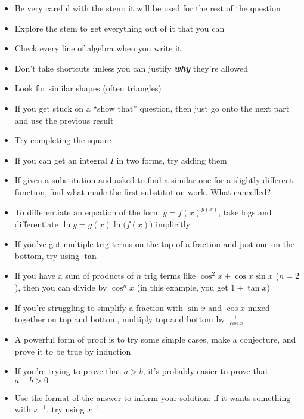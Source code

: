 \documentclass[../main.tex]{subfile}
\begin{document}


\begin{itemize}
	\item Be very careful with the stem; it will be used for the rest of the question
	\item Explore the stem to get everything out of it that you can
	\item Check every line of algebra when you write it
	\item Don't take shortcuts unless you can justify {\Large\textit{\textbf{why}}} they're allowed
	\item Look for similar shapes (often triangles)
	\item If you get stuck on a \enquote{show that} question, then just go onto the next part and use the previous result
	\item Try completing the square
\end{itemize}


\begin{itemize}
	\item If you can get an integral $I$ in two forms, try adding them
	\item If given a substitution and asked to find a similar one for a slightly different function, find what made the first substitution work. What cancelled?
	\item To differentiate an equation of the form $y = f(x)^{g(x)}$, take logs and differentiate $\ln y = g(x) \ln\big(f(x)\big)$ implicitly
\end{itemize}


\begin{itemize}
	\item If you've got multiple trig terms on the top of a fraction and just one on the bottom, try using $\tan$
	\item If you have a sum of products of $n$ trig terms like $\cos^2 x + \cos x\sin x$ ($n = 2$), then you can divide by $\cos^n x$ (in this example, you get $1 + \tan x$)
	\item If you're struggling to simplify a fraction with $\sin x$ and $\cos x$ mixed together on top and bottom, multiply top and bottom by $\frac{1}{\cos x}$
\end{itemize}


\begin{itemize}
	\item A powerful form of proof is to try some simple cases, make a conjecture, and prove it to be true by induction
	\item If you're trying to prove that $a > b$, it's probably easier to prove that $a - b > 0$
	\item Use the format of the answer to inform your solution: if it wants something with $x^{-1}$, try using $x^{-1}$
\end{itemize}
\end{document}
